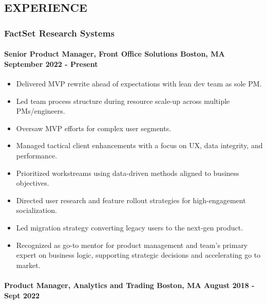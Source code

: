 \subsection{EXPERIENCE}\label{experience}

\subsubsection{FactSet Research Systems}\label{factset-research-systems}

\paragraph{\texorpdfstring{\textbf{Senior Product Manager, Front Office
Solutions} \textbar{} Boston, MA \textbar{} September 2022 -
Present}{Senior Product Manager, Front Office Solutions \textbar{} Boston, MA \textbar{} September 2022 - Present}}\label{senior-product-manager-front-office-solutions--boston-ma--september-2022---present}

\begin{itemize}
\tightlist
\item
  Delivered MVP rewrite ahead of expectations with lean dev team as sole
  PM.
\item
  Led team process structure during resource scale-up across multiple
  PMs/engineers.
\item
  Oversaw MVP efforts for complex user segments.
\item
  Managed tactical client enhancements with a focus on UX, data
  integrity, and performance.
\item
  Prioritized workstreams using data-driven methods aligned to business
  objectives.
\item
  Directed user research and feature rollout strategies for
  high-engagement socialization.
\item
  Led migration strategy converting legacy users to the next-gen
  product.
\item
  Recognized as go-to mentor for product management and team's primary
  expert on business logic, supporting strategic decisions and
  accelerating go to market.
\end{itemize}

\paragraph{\texorpdfstring{\textbf{Product Manager, Analytics and
Trading} \textbar{} Boston, MA \textbar{} August 2018 - Sept
2022}{Product Manager, Analytics and Trading \textbar{} Boston, MA \textbar{} August 2018 - Sept 2022}}\label{product-manager-analytics-and-trading--boston-ma--august-2018---sept-2022}

